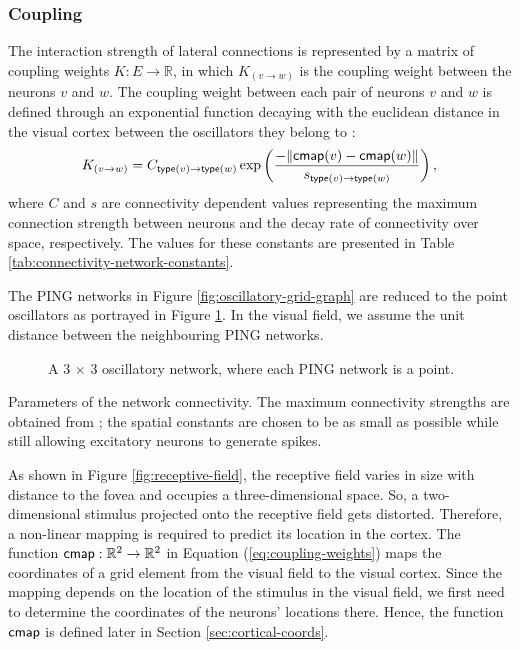 \subsubsection{Coupling}

The interaction strength of lateral connections is represented by a matrix of coupling weights $K: E \to \mathbb{R}$, in which $K_{(v \to w)}$ is the coupling weight between the neurons $v$ and $w$. 
The coupling weight between each pair of neurons $v$ and $w$ is defined through an exponential function decaying with the euclidean distance in the visual cortex between the oscillators they belong to \cite{Lowet2015}: 
\begin{equation}
    K_{(v \to w)} = C_{\mathsf{type}(v) \to \mathsf{type}(w)} \exp \left( \frac{-\| \mathsf{cmap}(v) - \mathsf{cmap}(w) \|}{s_{\mathsf{type}(v) \to \mathsf{type}(w)}} \right),
    \label{eq:coupling-weights}
\end{equation}
where $C$ and $s$ are connectivity dependent values representing the maximum connection strength between neurons and the decay rate of connectivity over space, respectively. The values for these constants are presented in Table \ref{tab:connectivity-network-constants}.

The PING networks in Figure \ref{fig:oscillatory-grid-graph} are reduced to the point oscillators as portrayed in Figure \ref{fig:oscillatory-point-grid}. In the visual field, we assume the unit distance between the neighbouring PING networks.

\begin{figure}[!htp]
    \centering
    
    \caption[Point-PING oscillatory network]{A 3 $\times$ 3 oscillatory network, where each PING network is a point.}
    \label{fig:oscillatory-point-grid}
\end{figure}

\begin{table}[!htp] 
    \centering
    
    \caption[Network connectivity parameters]{Parameters of the network connectivity. The maximum connectivity strengths are obtained from \cite{Lowet2015}; the spatial constants are chosen to be as small as possible while still allowing excitatory neurons to generate spikes.}
    \label{tab:connectivity-network-constants}
\end{table}

As shown in Figure \ref{fig:receptive-field}, the receptive field varies in size with distance to the fovea and occupies a three-dimensional space. So, a two-dimensional stimulus projected onto the receptive field gets distorted. Therefore, a non-linear mapping is required to predict its location in the cortex.
The function $\mathsf{cmap}: \mathbb{R}^2 \to \mathbb{R}^2$ in Equation (\ref{eq:coupling-weights}) maps the coordinates of a grid element from the visual field to the visual cortex. Since the mapping depends on the location of the stimulus in the visual field, we first need to determine the coordinates of the neurons' locations there. Hence, the function $\mathsf{cmap}$ is defined later in Section \ref{sec:cortical-coords}.

\begin{comment}

Let $\loc: V \to \mathbb{Z}_+^2$ be a function mapping a neuron to the position of the oscillator it belongs to in the grid, assuming the unit distance between the neighbouring PING networks.

\end{comment}